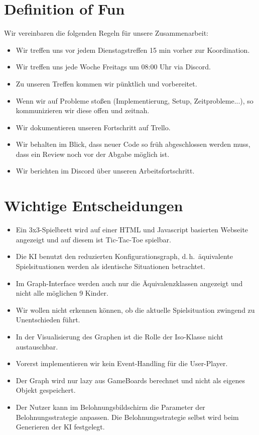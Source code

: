 \documentclass[titlepage]{scrartcl}
\begin{document}
\section{Definition of Fun}%
Wir vereinbaren die folgenden Regeln für unsere Zusammenarbeit:
\begin{itemize}
	\item Wir treffen uns vor jedem Dienstagstreffen 15 min vorher zur Koordination.
	\item Wir treffen uns jede Woche Freitags um 08:00 Uhr via Discord.
	\item Zu unseren Treffen kommen wir pünktlich und vorbereitet.
	\item Wenn wir auf Probleme stoßen (Implementierung, Setup, Zeitprobleme...), so kommunizieren wir diese offen und zeitnah.
	\item Wir dokumentieren unseren Fortschritt auf Trello.
	\item Wir behalten im Blick, dass neuer Code so früh abgeschlossen werden muss, dass ein Review noch vor der Abgabe möglich ist.
	\item Wir berichten im Discord über unseren Arbeitsfortschritt.
\end{itemize}

\section{Wichtige Entscheidungen}
\begin{itemize}
	\item Ein 3x3-Spielbrett wird auf einer HTML und Javascript basierten Webseite angezeigt und auf diesem ist Tic-Tac-Toe spielbar.
	\item Die KI benutzt den reduzierten Konfigurationsgraph, d.\,h.\ äquivalente Spielsituationen werden als identische Situationen betrachtet.
	\item Im Graph-Interface werden auch nur die Äquivalenzklassen angezeigt und nicht alle möglichen 9 Kinder.
	\item Wir wollen nicht erkennen können, ob die aktuelle Spielsituation zwingend zu Unentschieden führt.
	\item In der Visualisierung des Graphen ist die Rolle der Iso-Klasse nicht austauschbar.
	\item Vorerst implementieren wir kein Event-Handling für die User-Player.
	\item Der Graph wird nur lazy aus GameBoards berechnet und nicht als eigenes Objekt gespeichert.
	\item Der Nutzer kann im Belohnungsbildschirm die Parameter der Belohnungsstrategie anpassen. Die Belohnungsstrategie selbst wird beim Generieren der KI festgelegt.
\end{itemize}
\end{document}
